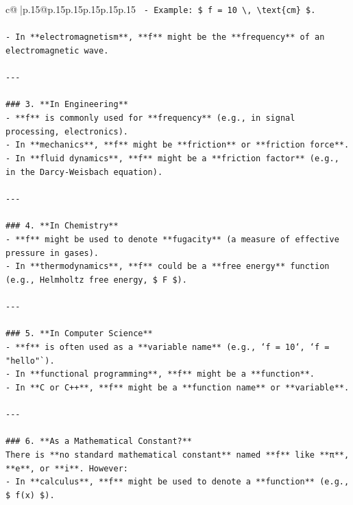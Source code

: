 \documentclass{article}
\begin{document}
{\begin{supertabular}{c@{$\;$}|p{.15\linewidth}@{}p{.15\linewidth}p{.15\linewidth}p{.15\linewidth}p{.15\linewidth}p{.15\linewidth}}
{{{\texttt{  {-} Example: \$ f = 10 \textbackslash{}, \textbackslash{}text\{cm\} \$.} \\
\\ 
\texttt{{-} In **electromagnetism**, **f** might be the **frequency** of an electromagnetic wave.} \\
\\ 
\texttt{{-}{-}{-}} \\
\\ 
\texttt{\#\#\# 3. **In Engineering**} \\
\texttt{{-} **f** is commonly used for **frequency** (e.g., in signal processing, electronics).} \\
\texttt{{-} In **mechanics**, **f** might be **friction** or **friction force**.} \\
\texttt{{-} In **fluid dynamics**, **f** might be a **friction factor** (e.g., in the Darcy{-}Weisbach equation).} \\
\\ 
\texttt{{-}{-}{-}} \\
\\ 
\texttt{\#\#\# 4. **In Chemistry**} \\
\texttt{{-} **f** might be used to denote **fugacity** (a measure of effective pressure in gases).} \\
\texttt{{-} In **thermodynamics**, **f** could be a **free energy** function (e.g., Helmholtz free energy, \$ F \$).} \\
\\ 
\texttt{{-}{-}{-}} \\
\\ 
\texttt{\#\#\# 5. **In Computer Science**} \\
\texttt{{-} **f** is often used as a **variable name** (e.g., `f = 10`, `f = "hello"`).} \\
\texttt{{-} In **functional programming**, **f** might be a **function**.} \\
\texttt{{-} In **C or C++**, **f** might be a **function name** or **variable**.} \\
\\ 
\texttt{{-}{-}{-}} \\
\\ 
\texttt{\#\#\# 6. **As a Mathematical Constant?**} \\
\texttt{There is **no standard mathematical constant** named **f** like **π**, **e**, or **i**. However:} \\
\texttt{{-} In **calculus**, **f** might be used to denote a **function** (e.g., \$ f(x) \$).} \\
}}}
\end{supertabular}}
\end{document}
